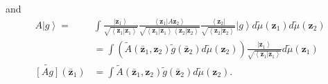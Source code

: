 \documentclass[aps,preprint]{revtex4}%
\begin{document}
and%
\begin{align}
A\left\vert g\right\rangle = &  \int\frac{\left\vert \mathbf{z}_{1}%
\right\rangle }{\sqrt{\left\langle \mathbf{z}_{1}\left\vert \mathbf{z}%
_{1}\right.  \right\rangle }}\frac{\left\langle \mathbf{z}_{1}\left\vert
A\mathbf{z}_{2}\right.  \right\rangle }{\sqrt{\left\langle \mathbf{z}%
_{1}\left\vert \mathbf{z}_{1}\right.  \right\rangle \left\langle
\mathbf{z}_{2}\left\vert \mathbf{z}_{2}\right.  \right\rangle }}%
\frac{\left\langle \mathbf{z}_{2}\right\vert }{\sqrt{\left\langle
\mathbf{z}_{2}\left\vert \mathbf{z}_{2}\right.  \right\rangle }}\left\vert
g\right\rangle d\tilde{\mu}\left(  \mathbf{z}_{1}\right)  d\tilde{\mu}\left(
\mathbf{z}_{2}\right)  \nonumber\\
&  =\int\left(  \tilde{A}\left(  \mathbf{\bar{z}}_{1},\mathbf{z}_{2}\right)
\tilde{g}\left(  \mathbf{\bar{z}}_{2}\right)  d\tilde{\mu}\left(
\mathbf{z}_{2}\right)  \right)  \frac{\left\vert \mathbf{z}_{1}\right\rangle
}{\sqrt{\left\langle \mathbf{z}_{1}\left\vert \mathbf{z}_{1}\right.
\right\rangle }}d\tilde{\mu}\left(  \mathbf{z}_{1}\right)  \nonumber\\
\widetilde{\left[  Ag\right]  }\left(  \mathbf{\bar{z}}_{1}\right)   &
=\int\tilde{A}\left(  \mathbf{\bar{z}}_{1},\mathbf{z}_{2}\right)  \tilde
{g}\left(  \mathbf{\bar{z}}_{2}\right)  d\tilde{\mu}\left(  \mathbf{z}%
_{2}\right)  .
\end{align}
\end{document}
